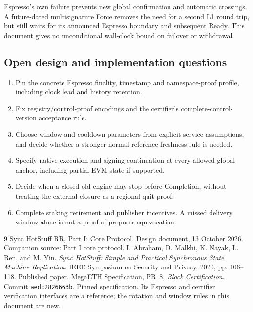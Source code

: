 \documentclass[11pt,a4paper]{article}
\newcounter{protocol}
\begin{document}
Espresso's own failure prevents new global confirmation and automatic
crossings. A future-dated multisignature Force removes the need for a
second L1 round trip, but still waits for its announced Espresso
boundary and subsequent Ready. This document gives no unconditional
wall-clock bound on failover or withdrawal.

\subsection{Open design and implementation questions}
\begin{enumerate}[label=(\arabic*)]
\item Pin the concrete Espresso finality, timestamp and namespace-proof
profile, including clock lead and history retention.
\item Fix registry/control-proof encodings and the certifier's
complete-control-version acceptance rule.
\item Choose window and cooldown parameters from explicit service
assumptions, and decide whether a stronger normal-reference freshness
rule is needed.
\item Specify native execution and signing continuation at every
allowed global anchor, including partial-EVM state if supported.
\item Decide when a closed old engine may stop before Completion,
without treating the external closure as a regional quit proof.
\item Complete staking retirement and publisher incentives. A missed
delivery window alone is not a proof of proposer equivocation.
\end{enumerate}

\begingroup\small
\begin{thebibliography}{9}
Sync HotStuff RR, Part I: Core Protocol. Design document, 13 October 2026.
Companion source: \href{run:sync_hotstuff_rr_part1_core.tex}{Part I core protocol}.
I. Abraham, D. Malkhi, K. Nayak, L. Ren, and M. Yin.
\emph{Sync HotStuff: Simple and Practical Synchronous State Machine Replication}.
IEEE Symposium on Security and Privacy, 2020, pp. 106--118.
\href{https://conferences.computer.org/sp/pdfs/sp/2020/349700a106.pdf}{Published paper}.
MegaETH Specification, PR~8, \emph{Block Certification}.
Commit \texttt{aedc2826663b}.
\href{https://github.com/megaeth-labs/specification/tree/aedc2826663b134ee25d26bea17e70c6d23d321c/specs/block-certification}{Pinned specification}.
Its Espresso and certifier verification interfaces are a reference;
the rotation and window rules in this document are new.
\end{thebibliography}
\endgroup
\end{document}
